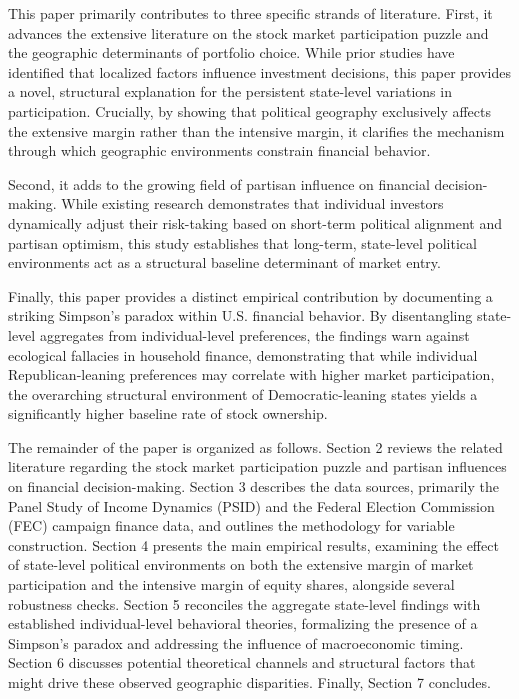 This paper primarily contributes to three specific strands of literature. First, it advances the extensive literature on the stock market participation puzzle and the geographic determinants of portfolio choice. While prior studies have identified that localized factors influence investment decisions, this paper provides a novel, structural explanation for the persistent state-level variations in participation. Crucially, by showing that political geography exclusively affects the extensive margin rather than the intensive margin, it clarifies the mechanism through which geographic environments constrain financial behavior.  

Second, it adds to the growing field of partisan influence on financial decision-making. While existing research demonstrates that individual investors dynamically adjust their risk-taking based on short-term political alignment and partisan optimism, this study establishes that long-term, state-level political environments act as a structural baseline determinant of market entry.  

Finally, this paper provides a distinct empirical contribution by documenting a striking Simpson's paradox within U.S. financial behavior. By disentangling state-level aggregates from individual-level preferences, the findings warn against ecological fallacies in household finance, demonstrating that while individual Republican-leaning preferences may correlate with higher market participation, the overarching structural environment of Democratic-leaning states yields a significantly higher baseline rate of stock ownership.


The remainder of the paper is organized as follows. Section 2 reviews the related literature regarding the stock market participation puzzle and partisan influences on financial decision-making. Section 3 describes the data sources, primarily the Panel Study of Income Dynamics (PSID) and the Federal Election Commission (FEC) campaign finance data, and outlines the methodology for variable construction. Section 4 presents the main empirical results, examining the effect of state-level political environments on both the extensive margin of market participation and the intensive margin of equity shares, alongside several robustness checks. Section 5 reconciles the aggregate state-level findings with established individual-level behavioral theories, formalizing the presence of a Simpson's paradox and addressing the influence of macroeconomic timing. Section 6 discusses potential theoretical channels and structural factors that might drive these observed geographic disparities. Finally, Section 7 concludes.